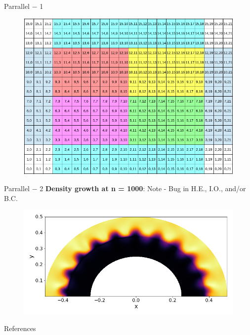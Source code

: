 \begin{frame}[t]{Parrallel $-$ 1}
  \vspace{-0.5cm}
 \begin{figure}[!htbp]
   \includegraphics[width=0.65\linewidth]{../fig/16x10compDomain}
   \centering
 \end{figure}
\end{frame}

\begin{frame}[t]{Parrallel $-$ 2}
  \textbf{Density growth at n = 1000}: Note - Bug in H.E., I.O., and/or B.C.
 \begin{figure}[!htbp]
   \includegraphics[width=0.85\linewidth]{fig/360x300parr}
   \centering
 \end{figure}
\end{frame}

\backupbegin

\begin{frame}[t,fragile]{References}

  \tiny
  
  
\end{frame}



\backupend






